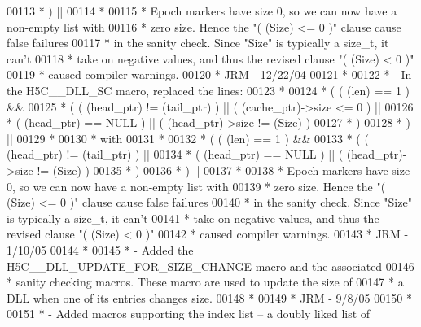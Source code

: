 \begin{DoxyCode}
00113 \textcolor{comment}{ *    ) ||}
00114 \textcolor{comment}{ *}
00115 \textcolor{comment}{ *    Epoch markers have size 0, so we can now have a non-empty list with}
00116 \textcolor{comment}{ *    zero size.  Hence the "( (Size) <= 0 )" clause cause false failures}
00117 \textcolor{comment}{ *    in the sanity check.  Since "Size" is typically a size\_t, it can't}
00118 \textcolor{comment}{ *    take on negative values, and thus the revised clause "( (Size) < 0 )"}
00119 \textcolor{comment}{ *    caused compiler warnings.}
00120 \textcolor{comment}{ *                                                     JRM - 12/22/04}
00121 \textcolor{comment}{ *}
00122 \textcolor{comment}{ *  - In the H5C\_\_DLL\_SC macro, replaced the lines:}
00123 \textcolor{comment}{ *}
00124 \textcolor{comment}{ *    ( ( (len) == 1 ) &&}
00125 \textcolor{comment}{ *      ( ( (head\_ptr) != (tail\_ptr) ) || ( (cache\_ptr)->size <= 0 ) ||}
00126 \textcolor{comment}{ *        ( (head\_ptr) == NULL ) || ( (head\_ptr)->size != (Size) )}
00127 \textcolor{comment}{ *      )}
00128 \textcolor{comment}{ *    ) ||}
00129 \textcolor{comment}{ *}
00130 \textcolor{comment}{ *    with}
00131 \textcolor{comment}{ *}
00132 \textcolor{comment}{ *    ( ( (len) == 1 ) &&}
00133 \textcolor{comment}{ *      ( ( (head\_ptr) != (tail\_ptr) ) ||}
00134 \textcolor{comment}{ *        ( (head\_ptr) == NULL ) || ( (head\_ptr)->size != (Size) )}
00135 \textcolor{comment}{ *      )}
00136 \textcolor{comment}{ *    ) ||}
00137 \textcolor{comment}{ *}
00138 \textcolor{comment}{ *    Epoch markers have size 0, so we can now have a non-empty list with}
00139 \textcolor{comment}{ *    zero size.  Hence the "( (Size) <= 0 )" clause cause false failures}
00140 \textcolor{comment}{ *    in the sanity check.  Since "Size" is typically a size\_t, it can't}
00141 \textcolor{comment}{ *    take on negative values, and thus the revised clause "( (Size) < 0 )"}
00142 \textcolor{comment}{ *    caused compiler warnings.}
00143 \textcolor{comment}{ *                                                     JRM - 1/10/05}
00144 \textcolor{comment}{ *}
00145 \textcolor{comment}{ *  - Added the H5C\_\_DLL\_UPDATE\_FOR\_SIZE\_CHANGE macro and the associated}
00146 \textcolor{comment}{ *    sanity checking macros.  These macro are used to update the size of}
00147 \textcolor{comment}{ *    a DLL when one of its entries changes size.}
00148 \textcolor{comment}{ *}
00149 \textcolor{comment}{ *                          JRM - 9/8/05}
00150 \textcolor{comment}{ *}
00151 \textcolor{comment}{ *  - Added macros supporting the index list -- a doubly liked list of }

\end{DoxyCode}
